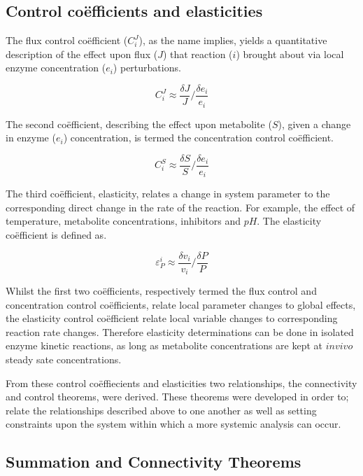 \subsection{Control co\"efficients and elasticities} 
The flux control co\"efficient ($C^{J}_{i}$), as the name implies, yields a quantitative description of the effect upon flux ($J$) that reaction ($i$) brought about via local enzyme concentration ($e_i$) perturbations.

\begin{equation}
C^{J}_{i}\approx\dfrac {\delta J}{J}/\dfrac {\delta e_{i}}{e_{i}}
\end{equation}

The second co\"efficient, describing the effect upon metabolite ($S$), given a change in enzyme ($e_{i}$) concentration, is termed the concentration control co\"efficient.

\begin{equation}
C^{S}_{i}\approx\dfrac{\delta S}{S}/\dfrac{\delta e_{i}}{e_{i}}
\end{equation}

The third co\"efficient, elasticity, relates a change in system parameter to the corresponding direct change in the rate of the reaction. For example, the effect of temperature, metabolite concentrations, inhibitors and $pH$. The elasticity co\"efficient is defined as.

\begin{equation}
\varepsilon^{i}_{P}\approx\dfrac{\delta v_{i}}{v_{i}}/\dfrac{\delta P}{P}
\end{equation}

Whilst the first two co\"efficients, respectively termed the flux control and concentration control co\"efficients, relate local parameter changes to global effects, the elasticity control co\"efficient relate local variable changes to corresponding reaction rate changes. Therefore elasticity determinations can be done in isolated enzyme kinetic reactions, as long as metabolite concentrations are kept at $in vivo$ steady sate concentrations. 

From these control co\"effiecients and elasticities two relationships, the connectivity and control theorems, were derived. These theorems were developed in order to; relate the relationships described above to one another as well as setting constraints upon the system within which a more systemic analysis can occur.

\subsection{Summation and Connectivity Theorems}


